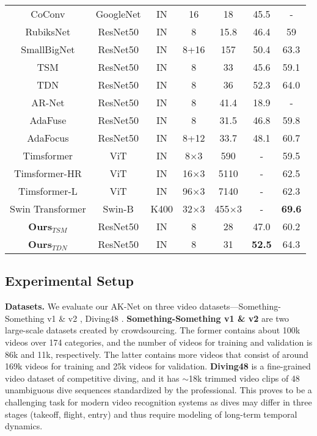 \documentclass[journal]{IEEEtran}
\begin{document}
\begin{table*}[ht]
\begin{tabular}{c|c|c|c|c|c|c}
		CoConv \cite{chen2021video} & GoogleNet & IN & 16 & 18 & 45.5 & - \\
		RubiksNet \cite{fan2020rubiksnet} & ResNet50 & IN & 8 & 15.8 & 46.4 & 59 \\
		SmallBigNet \cite{li2020smallbignet} & ResNet50 & IN & 8+16 & 157 & 50.4 & 63.3 \\
		TSM \cite{lin2019tsm} & ResNet50 & IN & 8 & 33 & 45.6 & 59.1 \\
		TDN \cite{wang2021tdn} & ResNet50 & IN & 8 & 36 & 52.3 & 64.0 \\	\hline
		AR-Net \cite{meng2020ar}  & ResNet50 & IN & 8 & 41.4 & 18.9 & - \\	
		AdaFuse \cite{meng2020adafuse} & ResNet50 & IN & 8 & 31.5 & 46.8 & 59.8 \\	
		AdaFocus \cite{Wang_2021_AdaFocus} & ResNet50 & IN & 8+12 & 33.7 & 48.1 & 60.7 \\	\hline
		Timsformer \cite{bertasius2021space} & ViT & IN & 8$\times 3$ & 590 & - & 59.5 \\
		Timsformer-HR \cite{bertasius2021space} & ViT & IN & 16$\times 3$ & 5110 & - & 62.5 \\
		Timsformer-L \cite{bertasius2021space} & ViT & IN & 96$\times 3$ & 7140 & - & 62.3 \\
		Swin Transformer \cite{liu2021video} & Swin-B & K400 & 32$\times 3$ & 455$\times 3$ & - & \textbf{69.6} \\
		\hline
		\textbf{Ours}$_{TSM}$ & ResNet50 & IN & 8 & 28 & 47.0  & 60.2\\
		\textbf{Ours}$_{TDN}$ & ResNet50 & IN & 8 & 31 & \textbf{52.5} & 64.3 \\
		\hline
	\end{tabular}
\end{table*}

\subsection{Experimental Setup}
\textbf{Datasets.}
We evaluate our AK-Net on three video datasets---Something-Something v1 \& v2 \cite{goyal2017something}, Diving48 \cite{li2018resound}.
\textbf{Something-Something v1 \& v2} are two large-scale datasets created by crowdsourcing.
The former contains about 100k videos over 174 categories, and the number of videos for training and validation is 86k and 11k, respectively.
The latter contains more videos that consist of around 169k videos for training and 25k videos for validation.
\textbf{Diving48} is a fine-grained video dataset of competitive diving, and it has $\sim$18k trimmed video clips of 48 unambiguous dive sequences standardized by the professional.
This proves to be a challenging task for modern video recognition systems as dives may differ in three stages (takeoff, flight, entry) and thus require modeling of long-term temporal dynamics.
\end{document}

